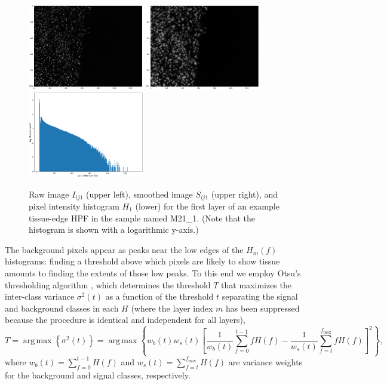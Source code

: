 \documentclass[letterpaper,11pt]{article}
\DeclareMathOperator*{\argmax}{arg\,max}
\newcommand{\fmax}{f_{\mathrm{max}}}
\begin{document}
\begin{figure}[!ht]
\centering
\includegraphics[width=0.45\textwidth]{images/masking/example_raw_image}
\includegraphics[width=0.45\textwidth]{images/masking/example_smoothed_image}
\includegraphics[width=0.45\textwidth]{images/masking/example_histogram}
\caption{\footnotesize Raw image $I_{ij1}$ (upper left), smoothed image $S_{ij1}$ (upper right), and pixel intensity histogram $H_{1}$ (lower) for the first layer of an example tissue-edge HPF in the sample named M21\_1. (Note that the histogram is shown with a logarithmic y-axis.)}
\label{fig:raw_to_smoothed_to_histogram}
\end{figure}

The background pixels appear as peaks near the low edges of the $H_{m}(f)$ histograms: finding a threshold above which pixels are likely to show tissue amounts to finding the extents of those low peaks. To this end we employ Otsu's thresholding algorithm \cite{4310076}, which determines the threshold $T$ that maximizes the inter-class variance $\sigma^2(t)$ as a function of the threshold $t$ separating the signal and background classes in each $H$ (where the layer index $m$ has been suppressed because the procedure is identical and independent for all layers),
\begin{equation}
T = \argmax{ \left\{ \sigma^2(t) \right\} } = \argmax{ \left\{ w_{b}(t) w_{s}(t) \left[ \frac{1}{w_{b}(t)}\sum_{f=0}^{t-1} f H(f) - \frac{1}{w_{s}(t)}\sum_{f=t}^{\fmax} f H(f) \right]^2 \right\} },
\label{eq:otsu_threshold_def}
\end{equation}  
where $w_{b}(t) = \sum_{f=0}^{t-1} H(f)$ and $w_{s}(t) = \sum_{f=t}^{\fmax} H(f)$ are variance weights for the background and signal classes, respectively.
\end{document}
